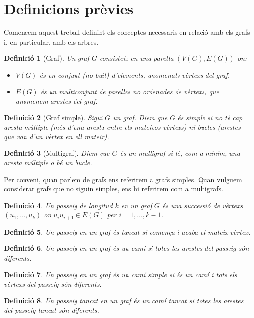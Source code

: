 \documentclass{article}
\newtheorem{definition}{Definició}[section]
\begin{document}
\section{Definicions prèvies}
    Comencem aquest treball definint els conceptes necessaris en relació amb els grafs i, en particular, amb els arbres.
    \begin{definition}[Graf]
        Un graf $G$ consisteix en una parella $(V(G), E(G))$ on:
        \begin{itemize}
            \item $V(G)$ és un conjunt (no buit) d'elements, anomenats vèrtexs del graf.
            \item $E(G)$ és un multiconjunt de parelles no ordenades de vèrtexs, que anomenem arestes del graf.
        \end{itemize}
    \end{definition}
    \begin{definition}[Graf simple]
        Sigui $G$ un graf. Diem que $G$ és simple si no té cap aresta múltiple (més d'una aresta entre els mateixos vèrtexs) ni bucles (arestes que van d'un vèrtex en ell mateix).
    \end{definition}
    \begin{definition}[Multigraf]
        Diem que $G$ és un multigraf si té, com a mínim, una aresta múltiple o bé un bucle.
    \end{definition}
    Per conveni, quan parlem de grafs ens referirem a grafs simples. Quan vulguem considerar grafs que no siguin simples, ens hi referirem com a multigrafs.
    \begin{definition}
    Un \textit{passeig de longitud} $k$ en un graf $G$ és una successió de vèrtexs $(u_1,\ldots,u_k)$ on $u_iu_{i+1}\in E(G)$ per $i=1,\ldots,k-1$.
    \end{definition}
    \begin{definition}
    Un passeig en un graf és \textit{tancat} si comença i acaba al mateix vèrtex.
    \end{definition}
    \begin{definition}
    Un passeig en un graf és un \textit{camí} si totes les arestes del passeig són diferents.
    \end{definition}
    \begin{definition}
    Un passeig en un graf és un \textit{camí simple} si és un camí i tots els vèrtexs del passeig són diferents.
    \end{definition}
    \begin{definition}
    Un passeig tancat en un graf és un \textit{camí tancat} si totes les arestes del passeig tancat són diferents.
    \end{definition}
\end{document}
